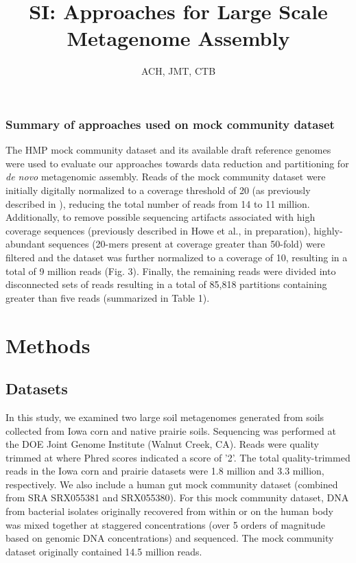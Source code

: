 \documentclass[11pt]{article} %
\begin{document}
\title{SI:  Approaches for Large Scale Metagenome Assembly}
\author{ACH, JMT, CTB}
\maketitle

\subsubsection{Summary of approaches used on mock community dataset}

The HMP mock community dataset and its available draft reference
genomes were used to evaluate our approaches towards data reduction
and partitioning for \emph{de novo} metagenomic assembly.  Reads of
the mock community dataset were initially digitally normalized to a
coverage threshold of 20 (as previously described in \cite{browndiginorm}),
reducing the total number of reads from 14 to 11 million.
Additionally, to remove possible sequencing artifacts associated with
high coverage sequences (previously described in Howe et al., in preparation),
highly-abundant sequences (20-mers present at coverage greater than
50-fold) were filtered and the dataset was further normalized to a
coverage of 10, resulting in a total of 9 million reads (Fig.
3).  Finally, the remaining reads were divided into
disconnected sets of reads resulting in a total of 85,818 partitions
containing greater than five reads (summarized in
Table 1).

\section{Methods}

\subsection{Datasets}
In this study, we examined two large soil metagenomes generated from
soils collected from Iowa corn and native prairie soils.  Sequencing
was performed at the DOE Joint Genome Institute (Walnut Creek, CA).
Reads were quality trimmed at where Phred scores indicated a score of
'2'.  The total quality-trimmed reads in the Iowa corn and prairie
datasets were 1.8 million and 3.3 million, respectively.  We also
include a human gut mock community dataset (combined from SRA
SRX055381 and SRX055380).  For this mock community dataset, DNA from
bacterial isolates originally recovered from within or on the human
body was mixed together at staggered concentrations (over 5 orders of
magnitude based on genomic DNA concentrations) and sequenced.  The
mock community dataset originally contained 14.5 million reads.
\end{document}

